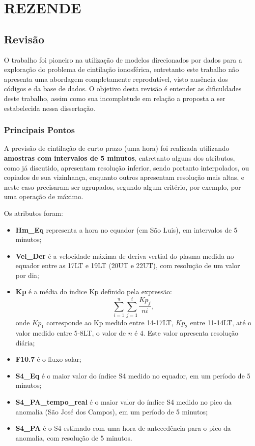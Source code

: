 \chapter{REZENDE}

\section{Revisão}

O trabalho \cite{REZENDE:2009} foi pioneiro na utilização de modelos direcionados por dados para a exploração do problema de cintilação ionosférica, entretanto este trabalho não apresenta uma abordagem completamente reprodutível, visto ausência dos códigos e da base de dados. O objetivo desta revisão é entender as dificuldades deste trabalho, assim como sua incompletude em relação a proposta a ser estabelecida nessa dissertação.

\subsection{Principais Pontos}

A previsão de cintilação de curto prazo (uma hora) foi realizada utilizando {\bf amostras com intervalos de 5 minutos}, entretanto alguns dos atributos, como já discutido, apresentam resolução inferior, sendo portanto interpolados, ou copiados de sua vizinhança, enquanto outros apresentam resolução mais altas, e neste caso precisaram ser agrupados, segundo algum critério, por exemplo, por uma operação de máximo.

Os atributos foram:

\begin{itemize}
\item {\bf Hm\_Eq} representa a hora no equador (em São Luis), em intervalos de 5 minutos;
\item {\bf Vel\_Der} é a velocidade máxima de deriva vertial do plasma medida no equador entre as 17LT e 19LT (20UT e 22UT), com resolução de um valor por dia;
\item {\bf Kp} é a média do índice Kp definido pela expressão:
\begin{equation}
\sum_{i=1}^{n}\sum_{j=1}^{i}\frac{Kp_{j}}{ni}\mbox{,}~
\end{equation}
onde $Kp_1$ corresponde ao Kp medido entre 14-17LT, $Kp_2$ entre 11-14LT, até o valor medido entre 5-8LT, o valor de $n$ é 4. Este valor apresenta resolução diária;
\item {\bf F10.7} é o fluxo solar;
\item {\bf S4\_Eq} é o maior valor do índice S4 medido no equador, em um período de 5 minutos;
\item {\bf S4\_PA\_tempo\_real} é o maior valor do índice S4 medido no pico da anomalia (São José dos Campos), em um período de 5 minutos;
\item {\bf S4\_PA} é o S4 estimado com uma hora de antecedência para o pico da anomalia, com resolução de 5 minutos.
\end{itemize}


